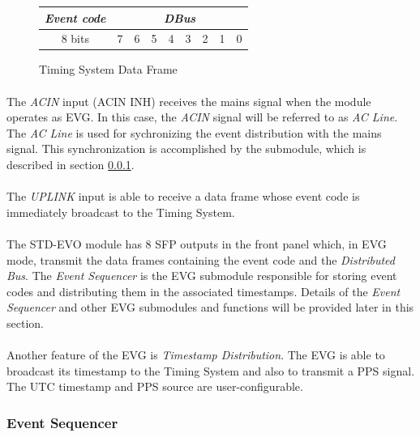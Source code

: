 \documentclass[openany]{article}
\begin{document}
	\begin{figure}[!h]
	\begin{tabular}{|cccccccc|c|c|c|c|c|c|c|c|}
	\hline
	\multicolumn{8}{|c|}{\emph{Event code}} & \multicolumn{8}{c|}{\emph{DBus}} \\ \hline
	\multicolumn{8}{|c|}{8 bits} & 7 & 6 & 5 & 4 & 3 & 2 & 1 & 0 \\ \hline
	\end{tabular}
	\centering
	\caption{Timing System Data Frame}
	\label{fig:data-frame-evg}
	\end{figure}
\FloatBarrier

	\paragraph{} The \emph{ACIN} input (ACIN INH) receives the mains signal when the module operates as EVG. In this case, the \emph{ACIN} signal will be referred to as \emph{AC Line}. The \emph{AC Line} is used for sychronizing the event distribution with the mains signal. This synchronization is accomplished by the \emph{} submodule, which is described in section \ref{sec:evg-event-sequencer}.
	\paragraph{} The \emph{UPLINK} input is able to receive a data frame whose event code is immediately broadcast to the Timing System.
	\paragraph{} The STD-EVO module has 8 SFP outputs in the front panel which, in EVG mode, transmit the data frames containing the event code and the \emph{Distributed Bus}. The \emph{Event Sequencer} is the EVG submodule responsible for storing event codes and distributing them in the associated timestamps. Details of the \emph{Event Sequencer} and other EVG submodules and functions will be provided later in this section.
	\paragraph{} Another feature of the EVG is \emph{Timestamp Distribution}. The EVG is able to broadcast its timestamp to the Timing System and also to transmit a PPS signal. The UTC timestamp and PPS source are user-configurable.

		\subsubsection{Event Sequencer}\label{sec:evg-event-sequencer}
\end{document}
